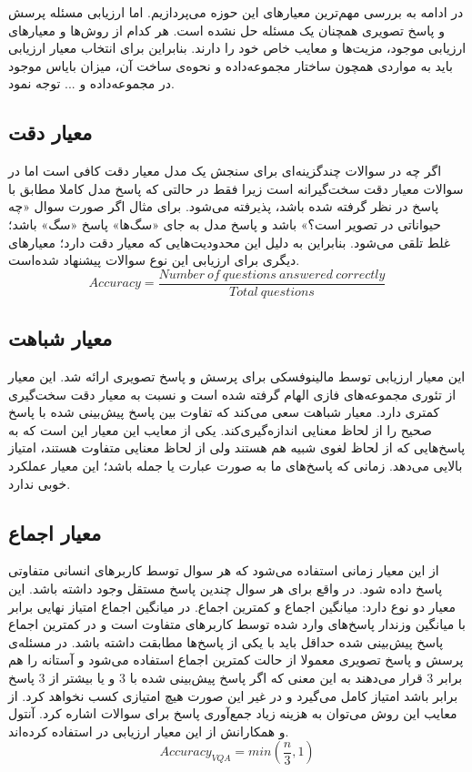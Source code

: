  در ادامه به بررسی  مهم‌ترین معیارهای این حوزه می‌پردازیم. اما ارزیابی مسئله پرسش و پاسخ تصویری همچنان یک مسئله حل نشده است. هر کدام از روش‌ها و معیارهای ارزیابی موجود، مزیت‌ها و معایب خاص خود را دارند. بنابراین برای انتخاب معیار ارزیابی باید به مواردی همچون ساختار مجموعه‌داده و نحوه‌ی ساخت آن، میزان بایاس موجود در مجموعه‌داده و ... توجه نمود. 

\subsection{معیار دقت}

		اگر چه در سوالات چندگزینه‌ای برای سنجش یک مدل معیار دقت کافی است اما در سوالات 
		معیار دقت سخت‌گیرانه است زیرا فقط در حالتی که پاسخ مدل کاملا مطابق با پاسخ در نظر گرفته شده باشد، پذیرفته می‌‌شود. برای مثال اگر صورت سوال «چه حیواناتی در تصویر است؟» باشد و پاسخ مدل به جای «سگ‌ها‌» پاسخ «سگ» باشد؛ غلط تلقی می‌شود. بنابراین به دلیل این محدودیت‌هایی که معیار دقت دارد؛ معیارهای دیگری برای ارزیابی این نوع سوالات پیشنهاد‌ شده‌است.
		\begin{equation}
		Accuracy = \frac{Number \ of \ questions \ answered \ correctly}{Total \ questions}
		\end{equation}

	
\subsection{معیار شباهت \cite{wu1994verb}}
	این معیار ارزیابی توسط مالینوفسکی 
	\cite{malinowski2014multi}
	برای پرسش و پاسخ تصویری ارائه شد. این معیار از تئوری مجموعه‌های فازی الهام گرفته شده است و نسبت به معیار دقت سخت‌گیری کمتری دارد. معیار شباهت 
	سعی می‌کند که تفاوت بین پاسخ پیش‌بینی شده با پاسخ صحیح  را از لحاظ معنایی اندازه‌گیری‌کند. یکی از معایب این معیار این است که به پاسخ‌هایی که از لحاظ لغوی شبیه هم هستند ولی از لحاظ معنایی متفاوت هستند، امتیاز بالایی می‌دهد. زمانی که پاسخ‌های ما به صورت عبارت یا جمله باشد؛ این  معیار عملکرد خوبی ندارد. 

\subsection{معیار اجماع}

		از این معیار زمانی استفاده می‌شود که هر سوال توسط کاربرهای انسانی متفاوتی پاسخ داده شود. در واقع برای هر سوال چندین پاسخ مستقل وجود داشته باشد. این معیار دو نوع دارد: میانگین اجماع و کمترین اجماع. در میانگین اجماع امتیاز نهایی برابر با میانگین وزندار پاسخ‌های وارد شده توسط کاربرهای متفاوت است و در کمترین اجماع پاسخ پیش‌بینی شده حداقل باید با یکی از پاسخ‌ها مطابقت داشته باشد. در مسئله‌ی پرسش و پاسخ تصویری معمولا از حالت کمترین اجماع استفاده می‌شود و آستانه را هم برابر 3 قرار می‌دهند به این معنی که اگر پاسخ پیش‌بینی شده با 3 و یا بیشتر از 3 پاسخ برابر باشد امتیاز کامل می‌گیرد و در غیر این صورت هیچ امتیازی کسب نخواهد کرد. از معایب این روش می‌توان به هزینه زیاد جمع‌آوری پاسخ برای سوالات اشاره کرد. آنتول و همکارانش از این معیار ارزیابی در 
		\cite{antol2015vqa}
		استفاده کرده‌اند.
		\begin{equation}
			Accuracy_{VQA} = min(\frac{n}{3}, 1)
		\end{equation}


